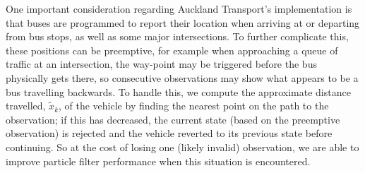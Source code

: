 One important consideration regarding Auckland Transport's \rt implementation is that
buses are programmed to report their location when arriving at or departing from
bus stops, as well as some major intersections.
To further complicate this,
these positions can be preemptive,
for example when approaching a queue of traffic at an intersection,
the way-point may be triggered before the bus physically gets there,
so consecutive observations may show what appears to be a bus travelling backwards.
To handle this, we compute the approximate distance travelled, $\tilde x_k$,
of the vehicle by finding the nearest point on the path to the observation;
if this has decreased, the current state (based on the preemptive observation)
is rejected and the vehicle reverted
to its previous state before continuing.
So at the cost of losing one (likely invalid) observation,
we are able to improve particle filter performance
when this situation is encountered.

